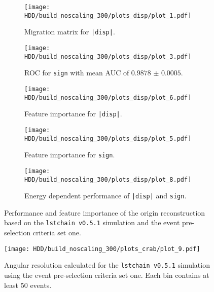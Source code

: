 \begin{figure}
    \centering
    \begin{subfigure}{0.49\textwidth}
        \centering
        \texttt{[image: HDD/build\_noscaling\_300/plots\_disp/plot\_1.pdf]}
        \caption{Migration matrix for \texttt{|disp|}.}
    \end{subfigure}
    \hfill
    \begin{subfigure}{0.49\textwidth}
        \centering
        \texttt{[image: HDD/build\_noscaling\_300/plots\_disp/plot\_3.pdf]}
        \caption{ROC for \texttt{sign} with mean AUC of $\num{0.9878(5)}$.}
    \end{subfigure}
    \newline\vfill
    \begin{subfigure}{0.49\textwidth}
        \centering
        \texttt{[image: HDD/build\_noscaling\_300/plots\_disp/plot\_6.pdf]}
        \caption{Feature importance for \texttt{|disp|}.}
    \end{subfigure}
    \hfill
    \begin{subfigure}{0.49\textwidth}
        \centering
        \texttt{[image: HDD/build\_noscaling\_300/plots\_disp/plot\_5.pdf]}
        \caption{Feature importance for \texttt{sign}.}
    \end{subfigure}
    \newline\vfill
    \begin{subfigure}{0.7\textwidth}
        \centering
        \texttt{[image: HDD/build\_noscaling\_300/plots\_disp/plot\_8.pdf]}
        \caption{Energy dependent performance of \texttt{|disp|} and \texttt{sign}.}
    \end{subfigure}
    \caption{Performance and feature importance of the origin reconstruction based on the \texttt{lstchain v0.5.1} simulation and the event pre-selection criteria set one.}
    \label{fig:origin_oldMC_300}
\end{figure}

\begin{figure}
    \centering
    \texttt{[image: HDD/build\_noscaling\_300/plots\_crab/plot\_9.pdf]}
    \caption{Angular resolution calculated for the \texttt{lstchain v0.5.1} simulation using the event pre-selection criteria set one.
        Each bin contains at least 50 events.
    }
    \label{fig:ang_res_oldMC_300}
\end{figure}

